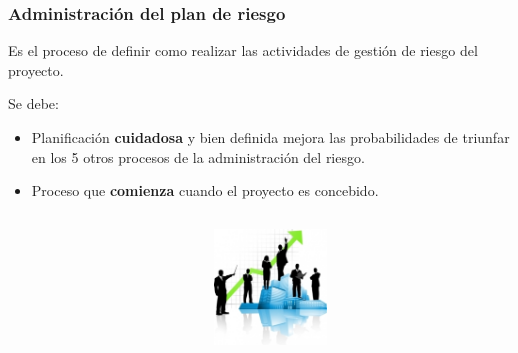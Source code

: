 
\begin{frame}
\frametitle{Administración del plan de riesgo}
Es el proceso de definir como realizar las actividades de gestión de riesgo del proyecto.

Se debe:
\begin{itemize}
    \item Planificación \textbf{cuidadosa} y bien definida mejora las probabilidades de
    triunfar en los 5 otros procesos de la administración del riesgo.
    \item Proceso que \textbf{comienza} cuando el proyecto es concebido.
\end{itemize}
\begin{columns}
	\begin{column}{0.6\textwidth}
	\end{column}
	\begin{column}{0.4\textwidth}
		\includegraphics[width=3cm]{img/random_img_1}
	\end{column}
\end{columns}
\end{frame}

